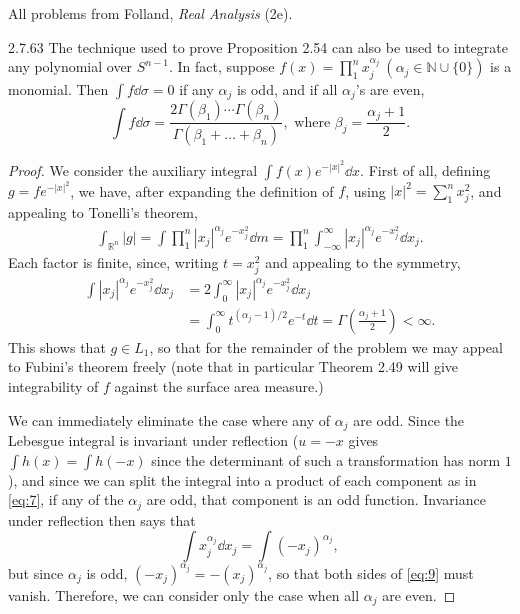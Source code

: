 \documentclass[11pt]{article}
\begin{document}
All problems from Folland, \textit{Real Analysis} (2e).

\begin{problem}{2.7.63}
  The technique used to prove Proposition 2.54 can also be used to integrate any polynomial over \( S^{n-1} \).
  In fact, suppose \( f(x) = \prod\limits_1^n x_j^{\alpha_j} \ (\alpha_j \in \mathbb{N} \cup \{0\}) \) is a monomial.
  Then \( \int f \dd{\sigma} = 0 \) if any \(\alpha_j\) is odd, and if all \(\alpha_j\)'s are even,
  \begin{equation}
  \label{eq:1}
  \int f \dd{\sigma} = \frac{2\Gamma(\beta_{1}) \cdots \Gamma(\beta_n)}{\Gamma(\beta_1 + \dots + \beta_{n})}, \text{ where } \beta_j = \frac{\alpha_{j}+1}{2}.
  \end{equation}
\end{problem}
\begin{proof}
  We consider the auxiliary integral \( \int f(x) e^{-|x|^2} \dd{x} \).
  First of all, defining \( g = f e^{-|x|^2}\), we have, after expanding the definition of \( f \), using \( |x|^2 = \sum\limits_1^n x_j^2 \), and appealing to Tonelli's theorem,
  \begin{equation}
    \label{eq:7}
    \begin{aligned}
      \int_{\mathbb{R}^{n}} |g| = \int \prod_1^n |x_{j}|^{\alpha_{j}} e^{-x_{j}^2} \dd{m} = \prod_1^n \int_{-\infty}^{\infty} |x_j|^{\alpha_j} e^{-x_j^2} \dd{x_{j}}.
    \end{aligned}
  \end{equation}
  Each factor is finite, since, writing \( t = x_j^2 \) and appealing to the symmetry,
  \begin{equation}
  \label{eq:8}
  \begin{aligned}
    \int |x_j|^{\alpha_j} e^{-x_j^2} \dd{x_j} &= 2 \int_0^{\infty} |x_j|^{\alpha_j} e^{-x_j^2} \dd{x_j} \\
    &= \int_0^{\infty} t^{(\alpha_j - 1)/2} e^{-t} \dd{t} = \Gamma\left(\frac{\alpha_{j} + 1}{2}\right) < \infty.
  \end{aligned}
\end{equation}
This shows that \( g \in L_1 \), so that for the remainder of the problem we may appeal to Fubini's theorem freely (note that in particular Theorem 2.49 will give integrability of \( f \) against the surface area measure.)

We can immediately eliminate the case where any of \(\alpha_j\) are odd.
Since the Lebesgue integral is invariant under reflection (\( u = -x \) gives \( \int h(x) = \int h(-x)  \) since the determinant of such a transformation has norm \( 1 \)), and since we can split the integral into a product of each component as in \cref{eq:7}, if any of the \(\alpha_j\) are odd, that component is an odd function.
Invariance under reflection then says that
\begin{equation}
\label{eq:9}
\int x_j^{\alpha_j} \dd{x_j} = \int (-x_j)^{\alpha_j},
\end{equation}
but since \( \alpha_j \) is odd, \( (-x_j)^{\alpha_j} = -(x_j)^{\alpha_j} \), so that both sides of \cref{eq:9} must vanish.
Therefore, we can consider only the case when all \( \alpha_j \) are even.


\end{proof}
\end{document}

